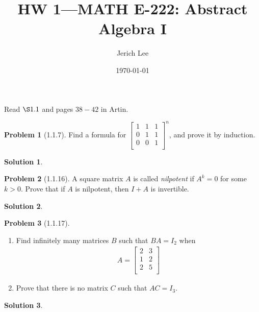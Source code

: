 \documentclass[12pt]{article}
\title{HW 1—MATH E-222: Abstract Algebra I}
\author{Jerich Lee}
\date{\today}
\theoremstyle{definition} %
\newtheorem{solution}{Solution}
\newtheorem{problem}{Problem}
\theoremstyle{plain} %
\begin{document}
\maketitle
\noindent
Read $\S 1.1$ and pages $38-42$ in Artin.  
\begin{problem}[1.1.7]
    Find a formula for $\begin{bmatrix}
        1 & 1 &  1 \\
        0 & 1 &  1 \\
        0 & 0 &  1 \\
    \end{bmatrix}^{n}$, and prove it by induction. 
\end{problem}
\begin{solution}
    
\end{solution}
\begin{problem}[1.1.16]
A square matrix $A$ is called \emph{nilpotent} if $A^{k}=0$ for some $k>0$. Prove that if $A$ is nilpotent, then $I+A$ is invertible.   
\end{problem}
\begin{solution}
    
\end{solution}
\begin{problem}[1.1.17]
   \begin{enumerate}
    \item Find infinitely many matrices $B$ such that $BA=I_2$ when 
    \begin{align}
        A= \begin{bmatrix}
            2 &  3 \\
            1 &  2 \\
            2 &  5 \\
        \end{bmatrix}
    \end{align}
    \item Prove that there is no matrix $C$ such that $AC=I_3$. 
   \end{enumerate} 
\end{problem}
\begin{solution}
    
\end{solution}
\end{document}
